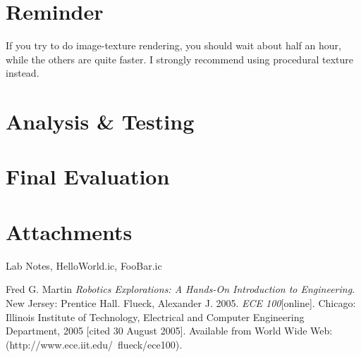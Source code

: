 \documentclass[a4paper, 11pt]{article}
\begin{document}
\section*{Reminder}
   \indent If you try to do image-texture rendering, you should wait about half an hour, while the others are quite faster. I strongly recommend using procedural texture instead.
\ifx

\section*{Analysis \& Testing}
\lipsum[6]

\section*{Final Evaluation}
\lipsum[7]

\section*{Attachments}
Lab Notes, HelloWorld.ic, FooBar.ic

\begin{thebibliography}{9}
 Fred G. Martin \emph{Robotics Explorations: A Hands-On Introduction to Engineering}. New Jersey: Prentice Hall.
  Flueck, Alexander J. 2005. \emph{ECE 100}[online]. Chicago: Illinois Institute of Technology, Electrical and Computer Engineering Department, 2005 [cited 30
August 2005]. Available from World Wide Web: (http://www.ece.iit.edu/~flueck/ece100).
\end{thebibliography}
\fi
\end{document}

